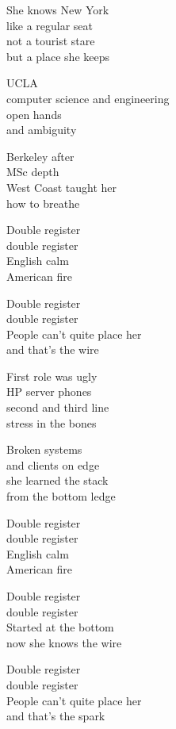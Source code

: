 \begin{lyrics}
She knows New York\\
like a regular seat\\
not a tourist stare\\
but a place she keeps

UCLA\\
computer science and engineering\\
open hands\\
and ambiguity

Berkeley after\\
MSc depth\\
West Coast taught her\\
how to breathe

Double register\\
double register\\
English calm\\
American fire

Double register\\
double register\\
People can’t quite place her\\
and that’s the wire

First role was ugly\\
HP server phones\\
second and third line\\
stress in the bones

Broken systems\\
and clients on edge\\
she learned the stack\\
from the bottom ledge

Double register\\
double register\\
English calm\\
American fire

Double register\\
double register\\
Started at the bottom\\
now she knows the wire

Double register\\
double register\\
People can’t quite place her\\
and that’s the spark
\end{lyrics}

